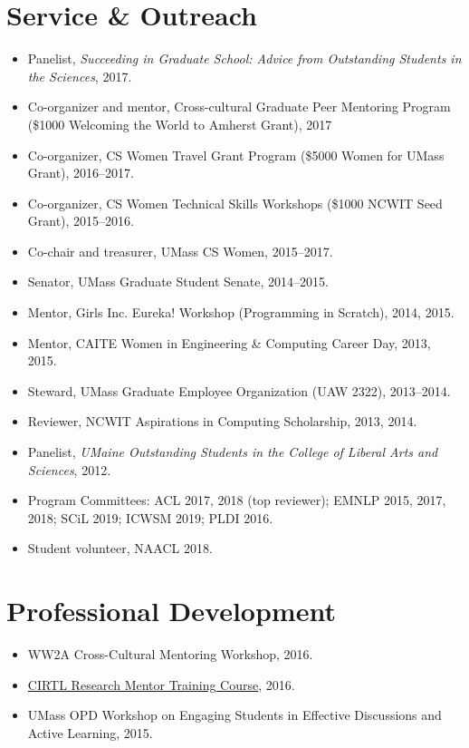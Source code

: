 \documentclass{resume}
\begin{document}
\section{Service \& Outreach}
\begin{itemize}
\item Panelist, \emph{Succeeding in Graduate School: Advice from Outstanding Students in the Sciences}, 2017. 
\item Co-organizer and mentor, Cross-cultural Graduate Peer Mentoring Program (\$1000 Welcoming the World to Amherst Grant), 2017
\item Co-organizer, CS Women Travel Grant Program (\$5000 Women for UMass Grant), 2016--2017.
\item Co-organizer, CS Women Technical Skills Workshops (\$1000 NCWIT Seed Grant), 2015--2016.
\item Co-chair and treasurer, UMass CS Women, 2015--2017.
\item Senator, UMass Graduate Student Senate, 2014--2015.
\item Mentor, Girls Inc. Eureka! Workshop (Programming in Scratch), 2014, 2015.
\item Mentor, CAITE Women in Engineering \& Computing Career Day, 2013, 2015.
\item Steward, UMass Graduate Employee Organization (UAW 2322), 2013--2014.
\item Reviewer, NCWIT Aspirations in Computing Scholarship, 2013, 2014.
\item Panelist, \emph{UMaine Outstanding Students in the College of Liberal Arts and Sciences}, 2012. 
\item Program Committees: ACL 2017, 2018 (top reviewer); EMNLP 2015, 2017, 2018; SCiL 2019; ICWSM 2019; PLDI 2016.
\item Student volunteer, NAACL 2018.
\end{itemize}

\section{Professional Development}
\begin{itemize}
\item WW2A Cross-Cultural Mentoring Workshop, 2016.
\item \href{https://www.cirtl.net/courses/261}{CIRTL Research Mentor Training Course}, 2016.
\item UMass OPD Workshop on Engaging Students in Effective Discussions and Active Learning, 2015.
\end{itemize}
\end{document}
